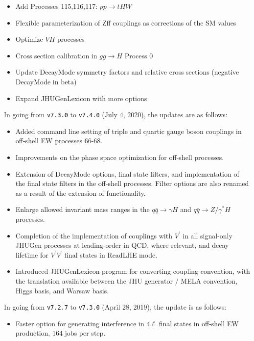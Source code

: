 \documentclass[aps,superscriptaddress,nofootinbib]{revtex4}
\begin{document}
\begin{itemize}
\item Add Processes 115,116,117: $pp\to tHW$
\item Flexible parameterization of Zff couplings as corrections of the SM values 
\item Optimize $VH$ processes 
\item Cross section calibration in $gg\to H$ Process 0
\item Update DecayMode symmetry factors and relative cross sections (negative DecayMode in beta)
\item Expand JHUGenLexicon with more options 
\end{itemize}
\noindent
In going from \verb|v7.3.0| to \verb|v7.4.0| (July 4, 2020), the updates are as follows:
\begin{itemize}
\item Added command line setting of triple and quartic gauge boson couplings in off-shell EW processes 66-68.
\item Improvements on the phase space optimization for off-shell processes.
\item Extension of DecayMode options, final state filters, and implementation of the final state filters in the off-shell processes. Filter options are also renamed as a result of the extension of functionality.
\item Enlarge allowed invariant mass ranges in the $q\bar{q} \to \gamma H$ and $q\bar{q} \to Z/\gamma^* H$ processes.
\item Completion of the implementation of couplings with $V^\prime$ in all signal-only JHUGen processes at leading-order in QCD, where relevant, and decay lifetime for $V^\prime V^\prime$ final states in ReadLHE mode.
\item Introduced JHUGenLexicon program for converting coupling convention, 
with the translation available between the JHU generator / MELA convention, Higgs basis, and Warsaw basis. 
\end{itemize}
\noindent
%
In going from \verb|v7.2.7| to \verb|v7.3.0| (April 28, 2019), the update is as follows:
\begin{itemize}
\item Faster option for generating interference in \(4\ell\) final states in off-shell EW production, 164 jobs per step.
\end{itemize}
\end{document}
